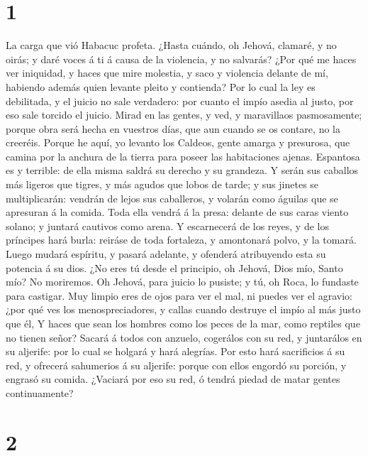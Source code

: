 \hypertarget{section}{%
\section{1}\label{section}}

 La carga que vió Habacuc profeta.  ¿Hasta
cuándo, oh Jehová, clamaré, y no oirás; y daré voces á ti á causa de la
violencia, y no salvarás?  ¿Por qué me haces ver
iniquidad, y haces que mire molestia, y saco y violencia delante de mí,
habiendo además quien levante pleito y contienda?  Por lo
cual la ley es debilitada, y el juicio no sale verdadero: por cuanto el
impío asedia al justo, por eso sale torcido el juicio. 
Mirad en las gentes, y ved, y maravillaos pasmosamente; porque obra será
hecha en vuestros días, que aun cuando se os contare, no la creeréis.
 Porque he aquí, yo levanto los Caldeos, gente amarga y
presurosa, que camina por la anchura de la tierra para poseer las
habitaciones ajenas.  Espantosa es y terrible: de ella
misma saldrá su derecho y su grandeza.  Y serán sus
caballos más ligeros que tigres, y más agudos que lobos de tarde; y sus
jinetes se multiplicarán: vendrán de lejos sus caballeros, y volarán
como águilas que se apresuran á la comida.  Toda ella
vendrá á la presa: delante de sus caras viento solano; y juntará
cautivos como arena.  Y escarnecerá de los reyes, y de
los príncipes hará burla: reiráse de toda fortaleza, y amontonará polvo,
y la tomará.  Luego mudará espíritu, y pasará adelante, y
ofenderá atribuyendo esta su potencia á su dios.  ¿No
eres tú desde el principio, oh Jehová, Dios mío, Santo mío? No
moriremos. Oh Jehová, para juicio lo pusiste; y tú, oh Roca, lo fundaste
para castigar.  Muy limpio eres de ojos para ver el mal,
ni puedes ver el agravio: ¿por qué ves los menospreciadores, y callas
cuando destruye el impío al más justo que él,  Y haces
que sean los hombres como los peces de la mar, como reptiles que no
tienen señor?  Sacará á todos con anzuelo, cogerálos con
su red, y juntarálos en su aljerife: por lo cual se holgará y hará
alegrías.  Por esto hará sacrificios á su red, y ofrecerá
sahumerios á su aljerife: porque con ellos engordó su porción, y engrasó
su comida.  ¿Vaciará por eso su red, ó tendrá piedad de
matar gentes continuamente?

\hypertarget{section-1}{%
\section{2}\label{section-1}}

